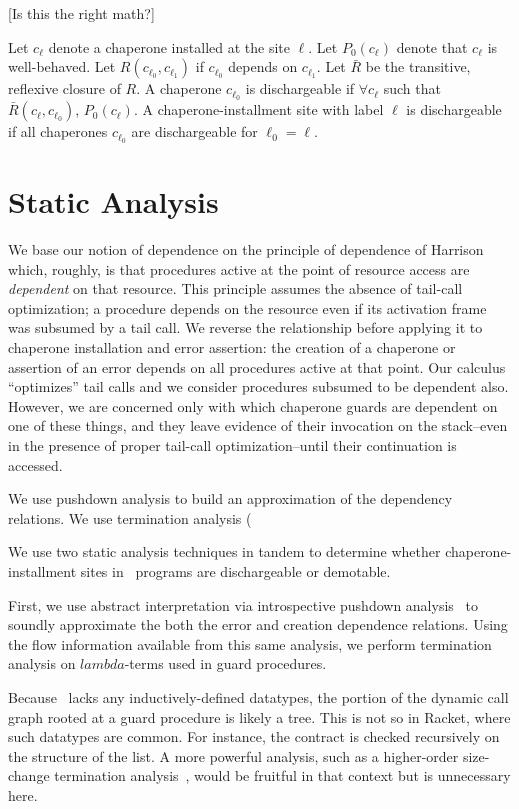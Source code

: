 \documentclass{sigplanconf}
\begin{document}
[Is this the right math?]

Let $c_\ell$ denote a chaperone installed at the site $\ell$.
Let $P_0(c_\ell)$ denote that $c_\ell$ is well-behaved.
Let $R(c_{\ell_0},c_{\ell_1})$ if $c_{\ell_0}$ depends on $c_{\ell_1}$.
Let $\bar{R}$ be the transitive, reflexive closure of $R$.
A chaperone $c_{\ell_0}$ is dischargeable if $\forall c_\ell$ such that $\bar{R}(c_\ell,c_{\ell_0})$, $P_0(c_\ell)$.
A chaperone-installment site with label $\ell$ is dischargeable if all chaperones $c_{\ell_0}$ are dischargeable for $\ell_0=\ell$.

\section{Static Analysis}

We base our notion of dependence on the principle of dependence of Harrison~\cite{harrison1989interprocedural} which, roughly, is that procedures active at the point of resource access are \emph{dependent} on that resource.
This principle assumes the absence of tail-call optimization; a procedure depends on the resource even if its activation frame was subsumed by a tail call.
We reverse the relationship before applying it to chaperone installation and error assertion: the creation of a chaperone or assertion of an error depends on all procedures active at that point.
Our calculus ``optimizes'' tail calls and we consider procedures subsumed to be dependent also.
However, we are concerned only with which chaperone guards are dependent on one of these things, and they leave evidence of their invocation on the stack--even in the presence of proper tail-call optimization--until their continuation is accessed.

We use pushdown analysis to build an approximation of the dependency relations.
We use termination analysis (

We use two static analysis techniques in tandem to determine whether chaperone-installment sites in \chapcalc\ programs are dischargeable or demotable.

First, we use abstract interpretation via introspective pushdown analysis~\cite{earl2012introspective} to soundly approximate the both the error and creation dependence relations.
Using the flow information available from this same analysis, we perform termination analysis on $lambda$-terms used in guard procedures.

Because \chapcalc\ lacks any inductively-defined datatypes, the portion of the dynamic call graph rooted at a guard procedure is likely a tree.
This is not so in Racket, where such datatypes are common.
For instance, the  contract is checked recursively on the structure of the list.
A more powerful analysis, such as a higher-order size-change termination analysis~\cite{sereni2007termination}, would be fruitful in that context but is unnecessary here.
\end{document}
